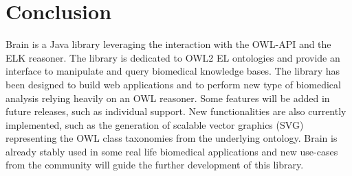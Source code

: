 \documentclass{llncs}
\begin{document}
\section{Conclusion}
Brain is a Java library leveraging the interaction with the OWL-API and the ELK reasoner. The library is dedicated to OWL2 EL ontologies
and provide an interface to manipulate and query biomedical knowledge bases. The library has been designed to build web applications
and to perform new type of biomedical analysis relying heavily on an OWL reasoner.
Some features will be added in future releases, such as
individual support. New functionalities are also currently implemented, such as the generation of scalable vector graphics (SVG) representing
the OWL class taxonomies from the underlying ontology. Brain is already stably used in some real life biomedical applications and new
use-cases from the community will guide the further development of this library.
%


\end{document}
